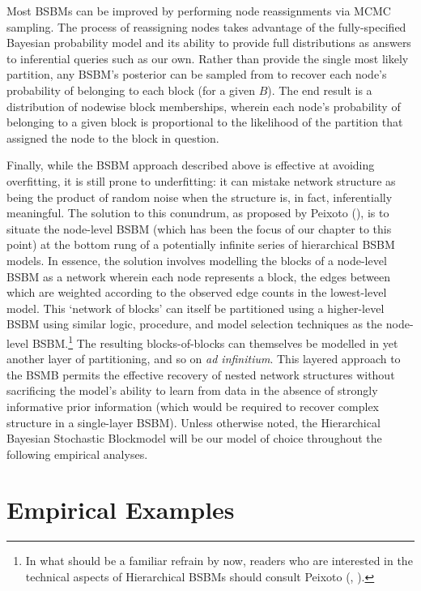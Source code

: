 \documentclass[
  12pt,
  a4paper,
  DIV=11,
  numbers=noendperiod,
  twoside,
  open=any]{scrartcl}
\begin{document}
Most BSBMs can be improved by performing node reassignments via MCMC
sampling. The process of reassigning nodes takes advantage of the
fully-specified Bayesian probability model and its ability to provide
full distributions as answers to inferential queries such as our own.
Rather than provide the single most likely partition, any BSBM's
posterior can be sampled from to recover each node's probability of
belonging to each block (for a given \(B\)). The end result is a
distribution of nodewise block memberships, wherein each node's
probability of belonging to a given block is proportional to the
likelihood of the partition that assigned the node to the block in
question.

Finally, while the BSBM approach described above is effective at
avoiding overfitting, it is still prone to underfitting: it can mistake
network structure as being the product of random noise when the
structure is, in fact, inferentially meaningful. The solution to this
conundrum, as proposed by Peixoto
(), is to situate the node-level
BSBM (which has been the focus of our chapter to this point) at the
bottom rung of a potentially infinite series of hierarchical BSBM
models. In essence, the solution involves modelling the blocks of a
node-level BSBM as a network wherein each node represents a block, the
edges between which are weighted according to the observed edge counts
in the lowest-level model. This `network of blocks' can itself be
partitioned using a higher-level BSBM using similar logic, procedure,
and model selection techniques as the node-level BSBM.\footnote{In what
  should be a familiar refrain by now, readers who are interested in the
  technical aspects of Hierarchical BSBMs should consult Peixoto
  (,
  ).} The resulting
blocks-of-blocks can themselves be modelled in yet another layer of
partitioning, and so on \emph{ad infinitium}. This layered approach to
the BSMB permits the effective recovery of nested network structures
without sacrificing the model's ability to learn from data in the
absence of strongly informative prior information (which would be
required to recover complex structure in a single-layer BSBM). Unless
otherwise noted, the Hierarchical Bayesian Stochastic Blockmodel will be
our model of choice throughout the following empirical analyses.

\section{Empirical Examples}\label{empirical-examples}
\end{document}

